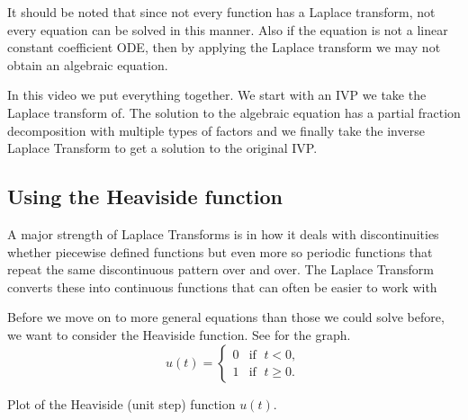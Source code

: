 It should be noted that since not every function has a Laplace transform,
not every equation can be solved in this manner.  Also if the equation
is not a linear constant coefficient ODE\@,
then by applying the Laplace transform we may not
obtain an algebraic equation.

\begin{video}
	In this video we put everything together. We start with an IVP we take the Laplace transform of. The solution to the algebraic equation has a partial fraction decomposition with multiple types of factors and we finally take the inverse Laplace Transform to get a solution to the original IVP.
\end{video}


\subsection{Using the Heaviside function}

\begin{video}
	A major strength of Laplace Transforms is in how it deals with discontinuities whether piecewise defined functions but even more so periodic functions that repeat the same discontinuous pattern over and over. The Laplace Transform converts these into continuous functions that can often be easier to work with
\end{video}

Before we move on to more general equations
than those we could solve before,
we want to consider the Heaviside function.  See 
for the graph.
\begin{equation*}
u(t) =
\begin{cases}
0 & \text{if } \; t < 0 , \\ 
1 & \text{if } \; t \geq 0 .
\end{cases}
\end{equation*}

\begin{myfig}
\capstart
{}
\caption{Plot of the Heaviside (unit step) function
$u(t)$.\label{lt:heavisidefig}}
\end{myfig}

